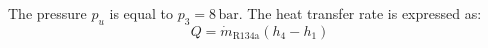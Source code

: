 The pressure \( p_u \) is equal to \( p_3 = 8 \, \text{bar} \).  
The heat transfer rate is expressed as:  
\[
Q = \dot{m}_{\text{R134a}} (h_4 - h_1)
\]